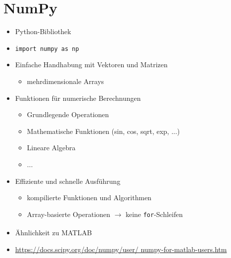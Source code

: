 \section{NumPy}
\begin{itemize}
	\item Python-Bibliothek
	\item[\-] \texttt{import numpy as np}
	\item Einfache Handhabung mit Vektoren und Matrizen
	\begin{itemize}
		\item mehrdimensionale Arrays
	\end{itemize}
	\item Funktionen für numerische Berechnungen
	\begin{itemize}
		\item Grundlegende Operationen
		\item Mathematische Funktionen (sin, cos, sqrt, exp, ...)
		\item Lineare Algebra
		\item ...
	\end{itemize}
	\item Effiziente und schnelle Ausführung
	\begin{itemize}
		\item kompilierte Funktionen und Algorithmen
		\item Array-basierte Operationen $\rightarrow$ keine \texttt{for}-Schleifen
	\end{itemize}
	\item Ähnlichkeit zu MATLAB\textsuperscript{\textregistered}
	\item[\-] \url{https://docs.scipy.org/doc/numpy/user/ numpy-for-matlab-users.htm}
\end{itemize}

